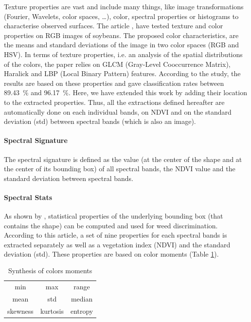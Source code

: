 \documentclass[../thesis.tex]{subfiles}
\begin{document}
    Texture properties are vast and include many things, like image transformations (Fourier, Wavelets, color spaces, \dots), color, spectral properties or histograms to characterise observed surfaces. The article \cite{mekhalfa2021supervised}, have tested texture and color properties on RGB images of soybeans. The proposed color characteristics, are the means and standard deviations of the image in two color spaces (RGB and HSV). In terms of texture properties, i.e. an analysis of the spatial distributions of the colors, the paper relies on GLCM (Gray-Level Cooccurrence Matrix), Haralick and LBP (Local Binary Pattern) features. According to the study, the results are based on these properties and gave classification rates between \SI{89.43}{\percent} and \SI{96.17}{\percent}. Here, we have extended this work by adding their location to the extracted properties. %
    Thus, all the extractions defined hereafter are automatically done on each individual bands, on NDVI and on the standard deviation (std) between spectral bands (which is also an image).
    
    \paragraph{Spectral Signature} The spectral signature is defined as the value (at the center of the shape and at the center of its bounding box) of all spectral bands, the NDVI value and the standard deviation between spectral bands.
    
    \paragraph{Spectral Stats} As shown by \cite{Lottes2016}, statistical properties of the underlying bounding box (that contains the shape) can be computed and used for weed discrimination. According to this article, a set of nine properties for each spectral bands is extracted separately as well as a vegetation index (NDVI) and the standard deviation (std). These properties are based on color moments (Table \ref{tab:colors-moments}).
    
    \vfill
    \begin{table}[H]
        \centering
        \begin{tabular}{c c c}
            \hline
            min & max & range \\
            mean & std & median \\
            skewness & kurtosis & entropy \\
            \hline
        \end{tabular}
        \caption{Synthesis of colors moments}
        \label{tab:colors-moments}
    \end{table}
    \vfill
    
\end{document}
